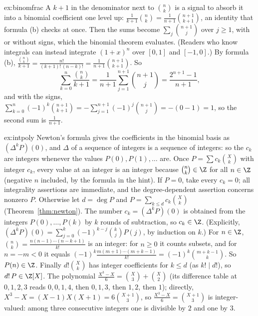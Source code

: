 \begin{solution}{ex:binomfrac}
\idea A $k+1$ in the denominator next to $\binom nk$ is a signal to absorb it into a binomial coefficient one level up: $\frac1{k+1}\binom nk=\frac1{n+1}\binom{n+1}{k+1}$, an identity that formula (b) checks at once. Then the sums become $\sum_j\binom{n+1}j$ over $j\ge1$, with or without signs, which the binomial theorem evaluates. (Readers who know integrals can instead integrate $(1+x)^n$ over $[0,1]$ and $[-1,0]$.)
\writeup By formula (b), $\frac{\binom nk}{k+1}=\frac{n!}{(k+1)!\,(n-k)!}=\frac1{n+1}\binom{n+1}{k+1}$. So
\[
\sum_{k=0}^n\frac{\binom nk}{k+1}=\frac1{n+1}\sum_{j=1}^{n+1}\binom{n+1}j=\frac{2^{n+1}-1}{n+1},
\]
and with the signs, $\sum_{k=0}^n(-1)^k\binom{n+1}{k+1}=-\sum_{j=1}^{n+1}(-1)^j\binom{n+1}j=-(0-1)=1$, so the second sum is $\frac1{n+1}$.
\end{solution}

\begin{solution}{ex:intpoly}
\idea Newton's formula gives the coefficients in the binomial basis as $(\Delta^kP)(0)$, and $\Delta$ of a sequence of integers is a sequence of integers: so the $c_k$ are integers whenever the values $P(0),P(1),\dots$ are. Once $P=\sum c_k\binom Xk$ with integer $c_k$, every value at an integer is an integer because $\binom nk\in\Z$ for all $n\in\Z$ (negative $n$ included, by the formula in the hint).
\writeup If $P=0$, take every $c_k=0$; all integrality assertions are immediate, and the degree-dependent assertion concerns nonzero $P$. Otherwise let $d=\deg P$ and $P=\sum_{k\le d}c_k\binom Xk$ (Theorem~\ref{thm:newton}). The number $c_k=(\Delta^kP)(0)$ is obtained from the integers $P(0),\dots,P(k)$ by $k$ rounds of subtraction, so $c_k\in\Z$. (Explicitly, $(\Delta^kP)(0)=\sum_{j=0}^k(-1)^{k-j}\binom kjP(j)$, by induction on $k$.) For $n\in\Z$, $\binom nk=\frac{n(n-1)\cdots(n-k+1)}{k!}$ is an integer: for $n\ge0$ it counts subsets, and for $n=-m<0$ it equals $(-1)^k\frac{m(m+1)\cdots(m+k-1)}{k!}=(-1)^k\binom{m+k-1}k$. So $P(n)\in\Z$. Finally $d!\binom Xk$ has integer coefficients for $k\le d$ (as $k!\mid d!$), so $d!\,P\in\Z[X]$. The polynomial $\frac{X^3-X}6=\binom X3+\binom X2$ (its difference table at $0,1,2,3$ reads $0,0,1,4$, then $0,1,3$, then $1,2$, then $1$); directly, $X^3-X=(X-1)X(X+1)=6\binom{X+1}3$, so $\frac{X^3-X}6=\binom{X+1}3$ is integer-valued: among three consecutive integers one is divisible by $2$ and one by $3$.
\end{solution}




